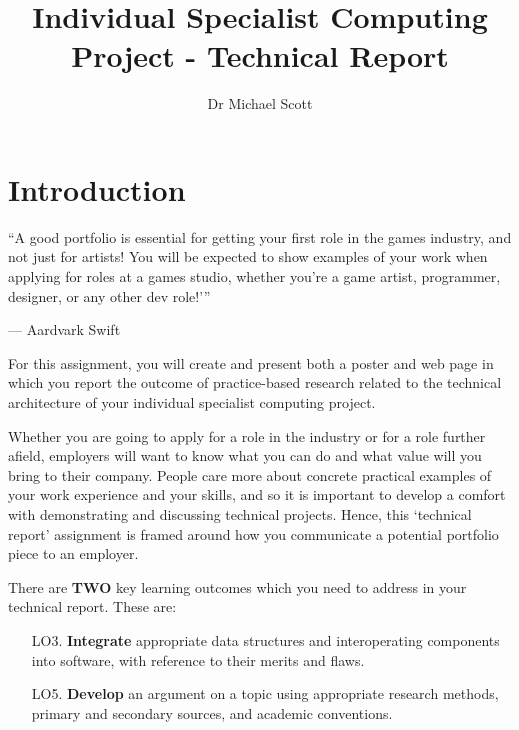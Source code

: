 \documentclass{../../fal_assignment}
\title{Individual Specialist Computing Project - Technical Report}
\author{Dr Michael Scott}
\begin{document}
\maketitle

\section*{Introduction}

\begin{marginquote}
``A good portfolio is essential for getting your first role in the games industry, and not just for artists! You will be expected to show examples of your work when applying for roles at a games studio, whether you’re a game artist, programmer, designer, or any other dev role!'\thinspace''

--- Aardvark Swift
\end{marginquote}

For this assignment, you will create and present both a poster and web page in which you report the outcome of practice-based research related to the technical architecture of your individual specialist computing project.

Whether you are going to apply for a role in the industry or for a role further afield, employers will want to know what you can do and what value will you bring
to their company. People care more about concrete practical examples of your work experience and your skills, and so it is important to develop a comfort with demonstrating
and discussing technical projects. Hence, this `technical report' assignment is framed around how you communicate a potential portfolio piece to an employer.
 
There are \textbf{TWO} key learning outcomes which you need to address in your technical report. These are:

\begin{itemize}
	\setlength{\itemindent}{1em}
	\item[LO3. ] \textbf{Integrate} appropriate data structures and interoperating components into software, with reference to their merits and flaws.
	\item[LO5. ] \textbf{Develop} an argument on a topic using appropriate research methods, primary and secondary sources, and academic conventions.
\end{itemize}
\end{document}
